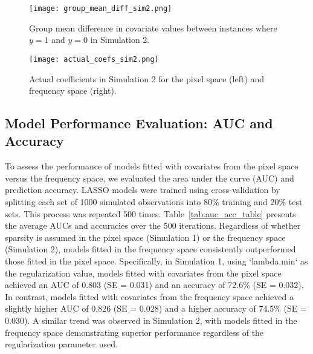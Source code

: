 \documentclass[12pt]{article}
\begin{document}
\begin{figure}[h!]
	\centering
	\texttt{[image: group\_mean\_diff\_sim2.png]}
	\caption{Group mean difference in covariate values between instances where \( y = 1 \) and \( y = 0 \) in Simulation 2.}
	\label{fig:group_diff2}
\end{figure}

\begin{figure}[h!]
	\centering
	\texttt{[image: actual\_coefs\_sim2.png]}
	\caption{Actual coefficients in Simulation 2 for the pixel space (left) and frequency space (right).}
	\label{fig:coefs_sim2}
\end{figure}

\FloatBarrier

\subsection*{Model Performance Evaluation: AUC and Accuracy}

To assess the performance of models fitted with covariates from the pixel space versus the frequency space, we evaluated
the area under the curve (AUC) and prediction accuracy. LASSO models were trained using cross-validation by splitting
each set of 1000 simulated observations into 80\% training and 20\% test sets. This process was repeated 500 times.
Table~\ref*{tab:auc_acc_table} presents the average AUCs and accuracies over the 500 iterations. Regardless of whether
sparsity is assumed in the pixel space (Simulation 1) or the frequency space (Simulation 2), models fitted in the
frequency space consistently outperformed those fitted in the pixel space. Specifically, in Simulation 1, using
`lambda.min` as the regularization value, models fitted with covariates from the pixel space achieved an AUC of
0.803 (SE = 0.031) and an accuracy of 72.6\% (SE = 0.032). In contrast, models fitted with covariates from the
frequency space achieved a slightly higher AUC of 0.826 (SE = 0.028) and a higher accuracy of
74.5\% (SE = 0.030). A similar trend was observed in Simulation 2, with models fitted in the frequency space
demonstrating superior performance regardless of the regularization parameter used.
\end{document}
